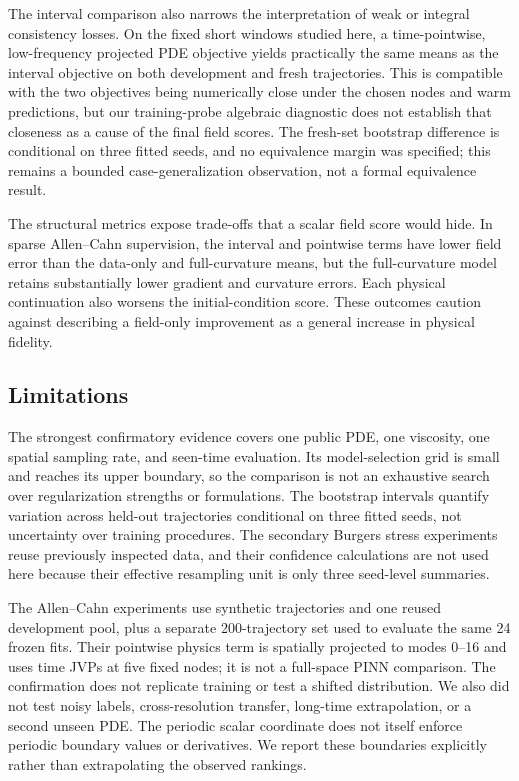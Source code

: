 \documentclass[a4paper,fleqn]{cas-sc}
\begin{document}
The interval comparison also narrows the interpretation of weak or integral consistency losses. On the fixed short windows studied here, a time-pointwise, low-frequency projected PDE objective yields practically the same means as the interval objective on both development and fresh trajectories. This is compatible with the two objectives being numerically close under the chosen nodes and warm predictions, but our training-probe algebraic diagnostic does not establish that closeness as a cause of the final field scores. The fresh-set bootstrap difference is conditional on three fitted seeds, and no equivalence margin was specified; this remains a bounded case-generalization observation, not a formal equivalence result.

The structural metrics expose trade-offs that a scalar field score would hide. In sparse Allen--Cahn supervision, the interval and pointwise terms have lower field error than the data-only and full-curvature means, but the full-curvature model retains substantially lower gradient and curvature errors. Each physical continuation also worsens the initial-condition score. These outcomes caution against describing a field-only improvement as a general increase in physical fidelity.

\subsection{Limitations}
The strongest confirmatory evidence covers one public PDE, one viscosity, one spatial sampling rate, and seen-time evaluation. Its model-selection grid is small and reaches its upper boundary, so the comparison is not an exhaustive search over regularization strengths or formulations. The bootstrap intervals quantify variation across held-out trajectories conditional on three fitted seeds, not uncertainty over training procedures. The secondary Burgers stress experiments reuse previously inspected data, and their confidence calculations are not used here because their effective resampling unit is only three seed-level summaries.

The Allen--Cahn experiments use synthetic trajectories and one reused development pool, plus a separate 200-trajectory set used to evaluate the same 24 frozen fits. Their pointwise physics term is spatially projected to modes 0--16 and uses time JVPs at five fixed nodes; it is not a full-space PINN comparison. The confirmation does not replicate training or test a shifted distribution. We also did not test noisy labels, cross-resolution transfer, long-time extrapolation, or a second unseen PDE. The periodic scalar coordinate does not itself enforce periodic boundary values or derivatives. We report these boundaries explicitly rather than extrapolating the observed rankings.
\end{document}
